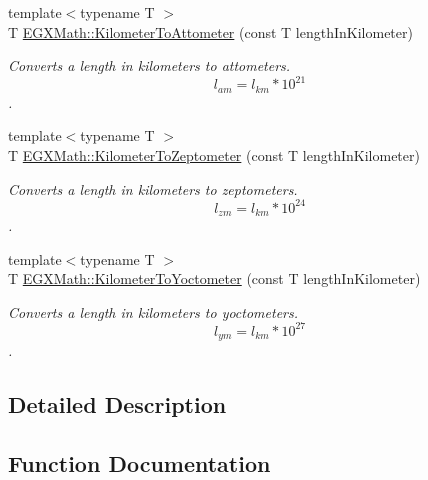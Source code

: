 \begin{DoxyCompactItemize}
{\footnotesize template$<$typename T $>$ }\\T \mbox{\hyperlink{group___e_g_x_math-_conversions-_length_conversions-_kilometer-_s_i_ga73569efb1cfc6e4972fe1cde86f221bd}{E\+G\+X\+Math\+::\+Kilometer\+To\+Attometer}} (const T length\+In\+Kilometer)
\begin{DoxyCompactList}\small\item\em Converts a length in kilometers to attometers. \[ l_{am}=l_{km} * 10^{21} \]. \end{DoxyCompactList}\item 
{\footnotesize template$<$typename T $>$ }\\T \mbox{\hyperlink{group___e_g_x_math-_conversions-_length_conversions-_kilometer-_s_i_ga377d2c4ad2db833c5a7c16861600da49}{E\+G\+X\+Math\+::\+Kilometer\+To\+Zeptometer}} (const T length\+In\+Kilometer)
\begin{DoxyCompactList}\small\item\em Converts a length in kilometers to zeptometers. \[ l_{zm}=l_{km} * 10^{24} \]. \end{DoxyCompactList}\item 
{\footnotesize template$<$typename T $>$ }\\T \mbox{\hyperlink{group___e_g_x_math-_conversions-_length_conversions-_kilometer-_s_i_gaf03c100edda155de40290d8c3e155a27}{E\+G\+X\+Math\+::\+Kilometer\+To\+Yoctometer}} (const T length\+In\+Kilometer)
\begin{DoxyCompactList}\small\item\em Converts a length in kilometers to yoctometers. \[ l_{ym}=l_{km} * 10^{27} \]. \end{DoxyCompactList}\end{DoxyCompactItemize}


\subsection{Detailed Description}


\subsection{Function Documentation}
\mbox{\label{group___e_g_x_math-_conversions-_length_conversions-_kilometer-_s_i_ga73569efb1cfc6e4972fe1cde86f221bd}} 
